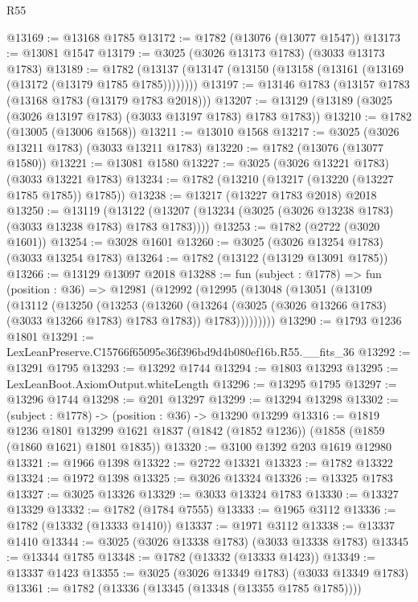 \begin{lexlean}{R55}
\begin{coremodule}
@13169 := @13168 @1785
@13172 := @1782 (@13076 (@13077 @1547))
@13173 := @13081 @1547
@13179 := @3025 (@3026 @13173 @1783) (@3033 @13173 @1783)
@13189 := @1782 (@13137 (@13147 (@13150 (@13158 (@13161 (@13169 (@13172 (@13179 @1785 @1785))))))))
@13197 := @13146 @1783 (@13157 @1783 (@13168 @1783 (@13179 @1783 @2018)))
@13207 := @13129 (@13189 (@3025 (@3026 @13197 @1783) (@3033 @13197 @1783) @1783 @1783))
@13210 := @1782 (@13005 (@13006 @1568))
@13211 := @13010 @1568
@13217 := @3025 (@3026 @13211 @1783) (@3033 @13211 @1783)
@13220 := @1782 (@13076 (@13077 @1580))
@13221 := @13081 @1580
@13227 := @3025 (@3026 @13221 @1783) (@3033 @13221 @1783)
@13234 := @1782 (@13210 (@13217 (@13220 (@13227 @1785 @1785)) @1785))
@13238 := @13217 (@13227 @1783 @2018) @2018
@13250 := @13119
    (@13122 (@13207 (@13234 (@3025 (@3026 @13238 @1783) (@3033 @13238 @1783) @1783 @1783))))
@13253 := @1782 (@2722 (@3020 @1601))
@13254 := @3028 @1601
@13260 := @3025 (@3026 @13254 @1783) (@3033 @13254 @1783)
@13264 := @1782 (@13122 (@13129 @13091 @1785))
@13266 := @13129 @13097 @2018
@13288 := fun (subject : @1778) =>
  fun (position : @36) =>
  @12981
    (@12992
      (@12995
        (@13048
          (@13051
            (@13109
              (@13112
                (@13250
                  (@13253
                    (@13260
                      (@13264 (@3025 (@3026 @13266 @1783) (@3033 @13266 @1783) @1783 @1783))
                      @1783)))))))))
@13290 := @1793 @1236 @1801
@13291 := LexLeanPreserve.C15766f65095e36f396bd9d4b080ef16b.R55.__fits_36
@13292 := @13291 @1795
@13293 := @13292 @1744
@13294 := @1803 @13293
@13295 := LexLeanBoot.AxiomOutput.whiteLength
@13296 := @13295 @1795
@13297 := @13296 @1744
@13298 := @201 @13297
@13299 := @13294 @13298
@13302 := (subject : @1778) -> (position : @36) -> @13290 @13299
@13316 := @1819
    @1236
    @1801
    @13299
    @1621
    @1837
    (@1842 (@1852 @1236))
    (@1858 (@1859 (@1860 @1621) @1801 @1835))
@13320 := @3100 @1392 @203 @1619 @12980
@13321 := @1966 @1398
@13322 := @2722 @13321
@13323 := @1782 @13322
@13324 := @1972 @1398
@13325 := @3026 @13324
@13326 := @13325 @1783
@13327 := @3025 @13326
@13329 := @3033 @13324 @1783
@13330 := @13327 @13329
@13332 := @1782 (@1784 @7555)
@13333 := @1965 @3112
@13336 := @1782 (@13332 (@13333 @1410))
@13337 := @1971 @3112
@13338 := @13337 @1410
@13344 := @3025 (@3026 @13338 @1783) (@3033 @13338 @1783)
@13345 := @13344 @1785
@13348 := @1782 (@13332 (@13333 @1423))
@13349 := @13337 @1423
@13355 := @3025 (@3026 @13349 @1783) (@3033 @13349 @1783)
@13361 := @1782 (@13336 (@13345 (@13348 (@13355 @1785 @1785))))

\end{coremodule}
\end{lexlean}
